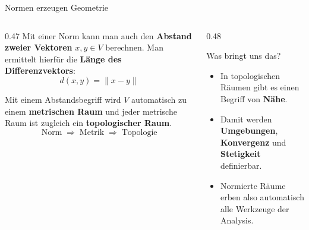 \begin{frame}{Normen erzeugen Geometrie}
  \small
\begin{columns}
\begin{column}{0.47\linewidth}
Mit einer Norm kann man auch den \textbf{Abstand zweier Vektoren} $x,y\in V$ berechnen. Man ermittelt hierfür die \textbf{Länge des Differenzvektors}:
\[
d(x,y) = \|x-y\|
\]

Mit einem Abstandsbegriff wird $V$ automatisch zu einem \textbf{metrischen Raum} und jeder metrische Raum ist zugleich ein \textbf{topologischer Raum}.
\[
\text{Norm} \;\Longrightarrow\; \text{Metrik} \;\Longrightarrow\; \text{Topologie}
\]
\end{column}
\begin{column}{0.48\linewidth}
\begin{block}{\small Was bringt uns das?}
\begin{itemize}
\item In topologischen Räumen gibt es einen Begriff von \textbf{Nähe}.
\item Damit werden \textbf{Umgebungen}, \textbf{Konvergenz} und \textbf{Stetigkeit} definierbar.
\item Normierte Räume erben also automatisch alle Werkzeuge der Analysis.
\end{itemize}
\end{block}
\end{column}
\end{columns}
\end{frame}

